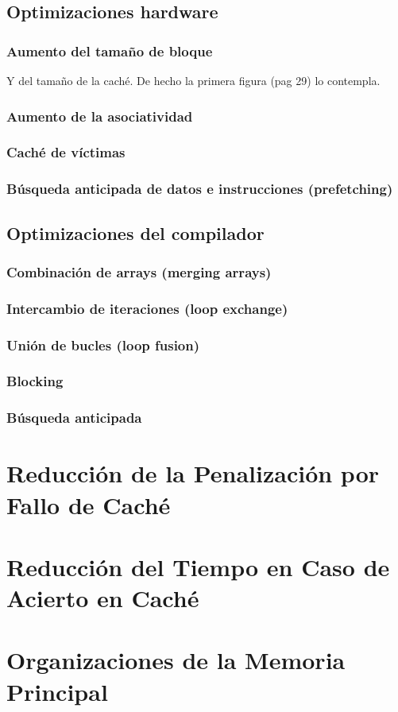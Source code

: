\documentclass[12pt,onecolumn]{memoir}
\begin{document}
\subsection{Optimizaciones hardware}

\subsubsection{Aumento del tamaño de bloque}

Y del tamaño de la caché. De hecho la primera figura (pag 29) lo contempla.

\subsubsection{Aumento de la asociatividad}

\subsubsection{Caché de víctimas}

\subsubsection{Búsqueda anticipada de datos e instrucciones (prefetching)}

\subsection{Optimizaciones del compilador}

\subsubsection{Combinación de arrays (merging arrays)}

\subsubsection{Intercambio de iteraciones (loop exchange)}

\subsubsection{Unión de bucles (loop fusion)}

\subsubsection{Blocking}

\subsubsection{Búsqueda anticipada}


\section{Reducción de la Penalización por Fallo de Caché}

\section{Reducción del Tiempo en Caso de Acierto en Caché}

\section{Organizaciones de la Memoria Principal}

 
 
\end{document}
